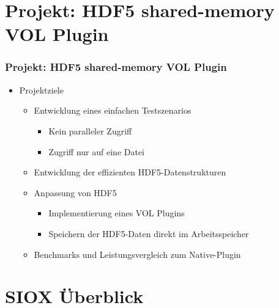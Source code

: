 \section{Projekt: HDF5 shared-memory VOL Plugin}
\begin{frame}
	\frametitle{Projekt: HDF5 shared-memory VOL Plugin}

	\begin{itemize}
		\item Projektziele
		\begin{itemize}
			\item Entwicklung eines einfachen Testszenarios
			\begin{itemize}
				\item Kein paralleler Zugriff
				\item Zugriff nur auf eine Datei
			\end{itemize}
			\item Entwicklung der effizienten HDF5-Datenstrukturen
			\item Anpassung von HDF5
			\begin{itemize}
				\item Implementierung eines VOL Plugins
				\item Speichern der HDF5-Daten direkt im Arbeitsspeicher
			\end{itemize}
			\item Benchmarks und Leistungsvergleich zum Native-Plugin
		\end{itemize}
	\end{itemize}
\end{frame}



\section{SIOX Überblick}

